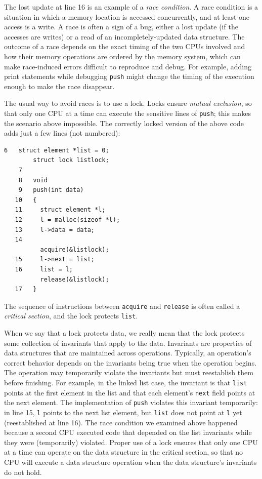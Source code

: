 The lost update at line 16 is an example of a
\textit{race condition}.
A race condition is a situation in which a memory location is accessed
concurrently, and at least one access is a write.
A race is often a sign of a bug, either a lost update
(if the accesses are writes) or a read of
an incompletely-updated data structure.
The outcome of a race depends on
the exact timing of the two CPUs involved and
how their memory operations are ordered by the memory system,
which can make race-induced errors difficult to reproduce
and debug.
For example, adding print statements while debugging
\lstinline{push}
might change the timing of the execution enough
to make the race disappear.

The usual way to avoid races is to use a lock.
Locks ensure
\textit{mutual exclusion},
so that only one CPU at a time can execute 
the sensitive lines of
\lstinline{push};
this makes the scenario above impossible.
The correctly locked version of the above code
adds just a few lines (not numbered):
\begin{lstlisting}[]
    6	struct element *list = 0;
     	struct lock listlock;
    7	
    8	void
    9	push(int data)
   10	{
   11	  struct element *l;
   12	  l = malloc(sizeof *l);
   13	  l->data = data;
   14	
     	  acquire(&listlock);
   15	  l->next = list;
   16	  list = l;
     	  release(&listlock);
   17	}
\end{lstlisting}
The sequence of instructions between
\lstinline{acquire}
and
\lstinline{release}
is often called a
\textit{critical section},
and the lock protects
\lstinline{list}.

When we say that a lock protects data, we really mean
that the lock protects some collection of invariants
that apply to the data.
Invariants are properties of data structures that
are maintained across operations.
Typically, an operation's correct behavior depends
on the invariants being true when the operation
begins.  The operation may temporarily violate
the invariants but must reestablish them before
finishing.
For example, in the linked list case, the invariant is that
\lstinline{list}
points at the first element in the list
and that each element's
\lstinline{next}
field points at the next element.
The implementation of
\lstinline{push}
violates this invariant temporarily: in line 15,
\lstinline{l}
points
to the next list element, but
\lstinline{list}
does not point at
\lstinline{l}
yet (reestablished at line 16).
The race condition we examined above
happened because a second CPU executed
code that depended on the list invariants
while they were (temporarily) violated.
Proper use of a lock ensures that only one CPU at a time
can operate on the data structure in the critical section, so that
no CPU will execute a data structure operation when the 
data structure's invariants do not hold.

